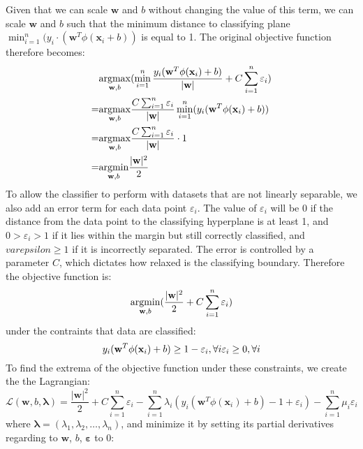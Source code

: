Given that we can scale $\mathbf{w}$ and $b$ without changing the value of this term, we can scale $\mathbf{w}$ and $b$ such that the minimum distance to classifying plane $\min_{i=1}^n(y_i \cdot (\mathbf{w}^T\phi(\mathbf{x}_i + b))$ is equal to 1. The original objective function therefore becomes:
\begin{align*}
    &\underset{\mathbf{w},b}{\operatorname{argmax}}(\min_{i=1}^{n}\frac{y_i(\mathbf{w}^T\phi(\mathbf{x}_i)+b)}{|\mathbf{w}|} + C\sum_{i=1}^n\varepsilon_i)\\
    =&\underset{\mathbf{w},b}{\operatorname{argmax}}\frac{C\sum_{i=1}^n\varepsilon_i}{|\mathbf{w}|}\min_{i=1}^{n}(y_i(\mathbf{w}^T\phi(\mathbf{x}_i)+b)) \\
    =&\underset{\mathbf{w},b}{\operatorname{argmax}}\frac{C\sum_{i=1}^n\varepsilon_i}{|\mathbf{w}|} \cdot 1 \\
    =&\underset{\mathbf{w},b}{\operatorname{argmin}}\frac{|\mathbf{w}|^2}{2}
\end{align*}
To allow the classifier to perform with datasets that are not linearly separable, we also add an error term for each data point $\varepsilon_i$. The value of $\varepsilon_i$ will be $0$ if the distance from the data point to the classifying hyperplane is at least 1, and $0>\varepsilon_i>1$ if it lies within the margin but still correctly classified, and $varepsilon \geq 1$ if it is incorrectly separated. The error is controlled by a parameter $C$, which dictates how relaxed is the classifying boundary. Therefore the objective function is:
\begin{equation*}
    \underset{\mathbf{w},b}{\operatorname{argmin}}(\frac{|\mathbf{w}|^2}{2} + C\sum_{i=1}^n \varepsilon_i)
\end{equation*}
under the contraints that data are classified:
\begin{equation*}
    y_i (\mathbf{w}^T\phi(\mathbf{x}_i) + b) \geq 1 - \varepsilon_i , \forall i\\
    \varepsilon_i \geq 0, \forall i
\end{equation*}
To find the extrema of the objective function under these constraints, we create the the Lagrangian:
\begin{equation} \label{lagr}
    \mathcal{L}(\mathbf{w}, b, \mathbf{\lambda})=\frac{|\mathbf{w}|^2}{2} + C\sum_{i=1}^n\varepsilon_i - \sum_{i=1}^n \lambda_i(y_i(\mathbf{w}^T\phi(\mathbf{x}_i) + b) - 1 + \varepsilon_i) - \sum_{i=1}^n \mu_i\varepsilon_i
\end{equation}
where $\mathbf{\lambda}=(\lambda_1, \lambda_2, \ldots, \lambda_n)$, and minimize it by setting its partial derivatives regarding to $\mathbf{w}$, $b$, $\mathbf{\varepsilon}$ to 0:

